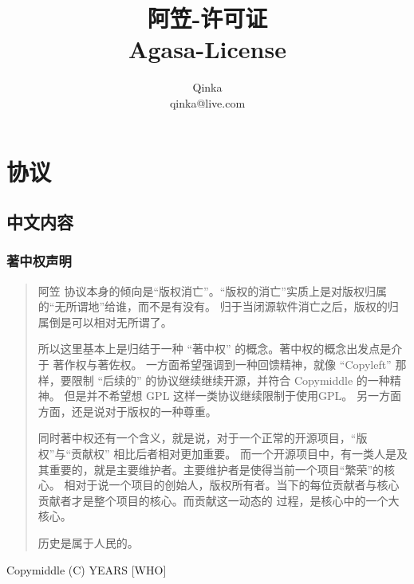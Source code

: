 \documentclass[UTF8]{book}
\author{Qinka \\ qinka@live.com}
\title{阿笠-许可证\\Agasa-License}
\begin{document}
\maketitle
\tableofcontents

\part{协议}
\chapter{中文内容}
\section{著中权声明}
\begin{quote}
    阿笠 协议本身的倾向是“版权消亡”。“版权的消亡”实质上是对版权归属的“无所谓地”给谁，而不是有没有。
    归于当闭源软件消亡之后，版权的归属倒是可以相对无所谓了。

    所以这里基本上是归结于一种 “著中权” 的概念。著中权的概念出发点是介于 著作权与著佐权。
    一方面希望强调到一种回馈精神，就像 “Copyleft” 那样，要限制 “后续的” 的协议继续继续开源，并符合 Copymiddle 的一种精神。
    但是并不希望想 GPL 这样一类协议继续限制于使用GPL。
    另一方面方面，还是说对于版权的一种尊重。

    同时著中权还有一个含义，就是说，对于一个正常的开源项目，“版权”与“贡献权” 相比后者相对更加重要。
    而一个开源项目中，有一类人是及其重要的，就是主要维护者。主要维护者是使得当前一个项目“繁荣”的核心。
    相对于说一个项目的创始人，版权所有者。当下的每位贡献者与核心贡献者才是整个项目的核心。而贡献这一动态的
    过程，是核心中的一个大核心。

    历史是属于人民的。
\end{quote}
Copymiddle (C) YEARS [WHO]

    
\end{document}

